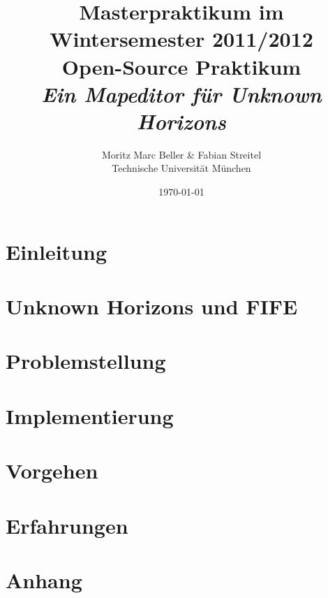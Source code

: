 \documentclass[german]{scrartcl}
\author{Moritz Marc Beller \& Fabian Streitel \\ Technische Universität München}
\title{Masterpraktikum im Wintersemester 2011/2012 \\
Open-Source Praktikum \\
\textit{Ein Mapeditor für Unknown Horizons}}
\date{\today} %
\begin{document}
\maketitle{}

\section{Einleitung}


\section{Unknown Horizons und FIFE}


\section{Problemstellung}


\section{Implementierung}


\section{Vorgehen}


\section{Erfahrungen}


\section*{Anhang}


{}
\end{document}
